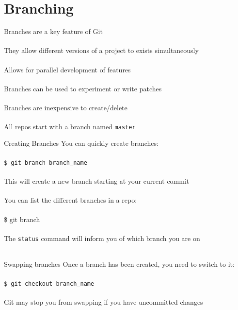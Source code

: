 \documentclass{beamer}
\begin{document}
\section{Branching}
\begin{frame}{\secname}
    Branches are a key feature of Git \\~\\

    They allow different versions of a project to exists simultaneously \\~\\
    
    Allows for parallel development of features \\~\\

    Branches can be used to experiment or write patches \\~\\

    Branches are inexpensive to create/delete \\~\\

    All repos start with a branch named {\tt master}
\end{frame}

\begin{frame}{Creating Branches}
    You can quickly create branches: \\~\\

    {\tt \$ git branch branch\_name} \\~\\

    This will create a new branch starting at your current commit\\~\\

    You can list the different branches in a repo: \\~\\

    {\$ git branch} \\~\\

    The {\tt status} command will inform you of which branch you are on \\~\\

\end{frame}

\begin{frame}{Swapping branches}
    Once a branch has been created, you need to switch to it: \\~\\

    {\tt \$ git checkout branch\_name} \\~\\

    Git may stop you from swapping if you have uncommitted changes
\end{frame}
\end{document}
